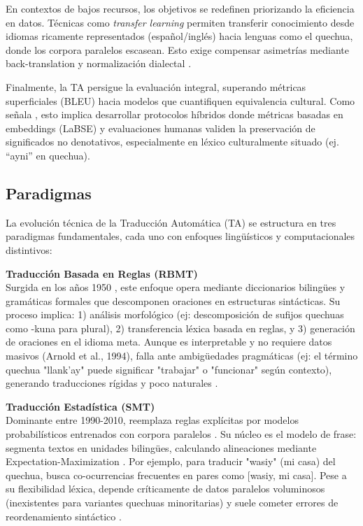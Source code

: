         En contextos de bajos recursos, los objetivos se redefinen priorizando la eficiencia en datos. Técnicas como \textit{transfer learning} \cite{zoph2016transfer} permiten transferir conocimiento desde idiomas ricamente representados (español/inglés) hacia lenguas como el quechua, donde los corpora paralelos escasean. Esto exige compensar asimetrías mediante back-translation y normalización dialectal \cite{sennrich2015improving}.
        
        Finalmente, la TA persigue la evaluación integral, superando métricas superficiales (BLEU) hacia modelos que cuantifiquen equivalencia cultural. Como señala \cite{lommel2018translation}, esto implica desarrollar protocolos híbridos donde métricas basadas en embeddings (LaBSE) y evaluaciones humanas validen la preservación de significados no denotativos, especialmente en léxico culturalmente situado (ej. ``ayni'' en quechua).

        \subsection{Paradigmas}
        La evolución técnica de la Traducción Automática (TA) se estructura en tres paradigmas fundamentales, cada uno con enfoques lingüísticos y computacionales distintivos:

        \textbf{Traducción Basada en Reglas (RBMT)}\\
        Surgida en los años 1950 \cite{hutchins1986machine}, este enfoque opera mediante diccionarios bilingües y gramáticas formales que descomponen oraciones en estructuras sintácticas. Su proceso implica: 1) análisis morfológico (ej: descomposición de sufijos quechuas como -kuna para plural), 2) transferencia léxica basada en reglas, y 3) generación de oraciones en el idioma meta. Aunque es interpretable y no requiere datos masivos (Arnold et al., 1994), falla ante ambigüedades pragmáticas (ej: el término quechua "llank'ay" puede significar "trabajar" o "funcionar" según contexto), generando traducciones rígidas y poco naturales \cite{kay1997proper}.
        
        \textbf{Traducción Estadística (SMT)}\\
        Dominante entre 1990-2010, reemplaza reglas explícitas por modelos probabilísticos entrenados con corpora paralelos \cite{brown1993mathematics}. Su núcleo es el modelo de frase: segmenta textos en unidades bilingües, calculando alineaciones mediante Expectation-Maximization \cite{koehn2020neural}. Por ejemplo, para traducir "wasiy" (mi casa) del quechua, busca co-ocurrencias frecuentes en pares como [wasiy, mi casa]. Pese a su flexibilidad léxica, depende críticamente de datos paralelos voluminosos (inexistentes para variantes quechuas minoritarias) y suele cometer errores de reordenamiento sintáctico \cite{och2003systematic}.
        
